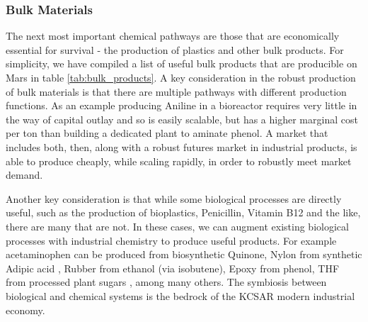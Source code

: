 \documentclass[fleqn,10pt]{Stylesheet} %
\begin{document}
\subsubsection{Bulk Materials}
\label{sec:necessities_bulk}

The next most important chemical pathways are those that are economically essential for survival - the production of plastics and other bulk products. For simplicity, we have compiled a list of useful bulk products that are producible on Mars in table \ref{tab:bulk_products}. A key consideration in the robust production of bulk materials is that there are multiple pathways with different production functions. As an example producing Aniline in a bioreactor requires very little in the way of capital outlay and so is easily scalable, but has a higher marginal cost per ton than building a dedicated plant to aminate phenol. A market that includes both, then, along with a robust futures market in industrial products, is able to produce cheaply, while scaling rapidly, in order to robustly meet market demand.

Another key consideration is that while some biological processes are directly useful, such as the production of bioplastics, Penicillin, Vitamin B12 and the like, there are many that are not. In these cases, we can augment existing biological processes with industrial chemistry to produce useful products. For example acetaminophen can be produced from biosynthetic Quinone, Nylon from synthetic Adipic acid \cite{WeiNiu2002}, Rubber from ethanol \cite{JunmingSun2011} (via isobutene), Epoxy from phenol, THF from processed plant sugars \cite{ShuoChen2018}, among many others. The symbiosis between biological and chemical systems is the bedrock of the KCSAR modern industrial economy.
\end{document}
